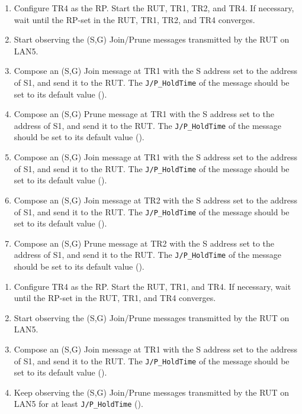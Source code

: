 \documentclass[11pt]{report}
\begin{document}

\begin{enumerate}

  \item Configure TR4 as the RP. Start the RUT, TR1, TR2, and TR4. If
  necessary, wait until the RP-set in the RUT, TR1, TR2, and TR4
  converges.

  \item Start observing the (S,G) Join/Prune messages transmitted by the
  RUT on LAN5.

  \item Compose an (S,G) Join message at TR1 with the S address set to the
  address of S1, and send it to the RUT. 
  The \verb=J/P_HoldTime= of the message should be set to its default
  value ({\PimsmJPHoldTime}).

  \item Compose an (S,G) Prune message at TR1 with the S address set to the
  address of S1, and send it to the RUT. 
  The \verb=J/P_HoldTime= of the message should be set to its default
  value ({\PimsmJPHoldTime}).

  \item Compose an (S,G) Join message at TR1 with the S address set to the
  address of S1, and send it to the RUT. 
  The \verb=J/P_HoldTime= of the message should be set to its default
  value ({\PimsmJPHoldTime}).

  \item Compose an (S,G) Join message at TR2 with the S address set to the
  address of S1, and send it to the RUT. 
  The \verb=J/P_HoldTime= of the message should be set to its default
  value ({\PimsmJPHoldTime}).

  \item Compose an (S,G) Prune message at TR2 with the S address set to the
  address of S1, and send it to the RUT. 
  The \verb=J/P_HoldTime= of the message should be set to its default
  value ({\PimsmJPHoldTime}).

\end{enumerate}


\begin{enumerate}

  \item Configure TR4 as the RP. Start the RUT, TR1, and TR4. If
  necessary, wait until the RP-set in the RUT, TR1, and TR4
  converges.

  \item Start observing the (S,G) Join/Prune messages transmitted by the
  RUT on LAN5.

  \item Compose an (S,G) Join message at TR1 with the S address set to the
  address of S1, and send it to the RUT. 
  The \verb=J/P_HoldTime= of the message should be set to its default
  value ({\PimsmJPHoldTime}).

  \item Keep observing the (S,G) Join/Prune messages transmitted by the
  RUT on LAN5 for at least \verb=J/P_HoldTime= ({\PimsmJPHoldTime}).

\end{enumerate}
\end{document}
